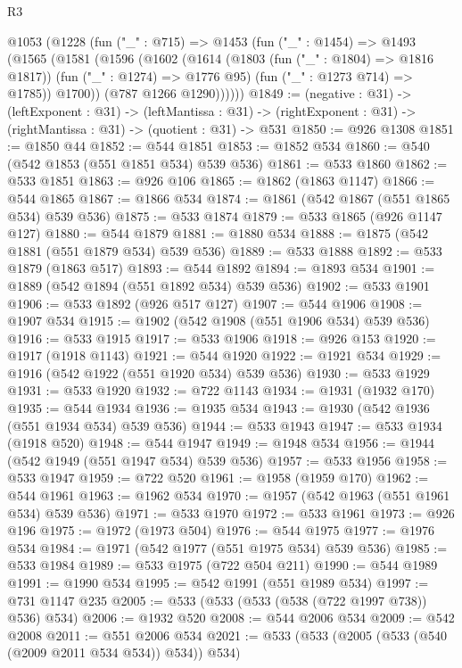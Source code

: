 \begin{lexlean}{R3}
\begin{coremodule}
  @1053
    (@1228
      (fun ("_" : @715) =>
      @1453
        (fun ("_" : @1454) =>
        @1493
          (@1565
            (@1581
              (@1596
                (@1602
                  (@1614
                    (@1803 (fun ("_" : @1804) => @1816 @1817))
                    (fun ("_" : @1274) => @1776 @95)
                    (fun ("_" : @1273 @714) => @1785))
                  @1700))
              (@787 @1266 @1290))))))
@1849 := (negative : @31) ->
  (leftExponent : @31) ->
  (leftMantissa : @31) -> (rightExponent : @31) -> (rightMantissa : @31) -> (quotient : @31) -> @531
@1850 := @926 @1308
@1851 := @1850 @44
@1852 := @544 @1851
@1853 := @1852 @534
@1860 := @540 (@542 @1853 (@551 @1851 @534) @539 @536)
@1861 := @533 @1860
@1862 := @533 @1851
@1863 := @926 @106
@1865 := @1862 (@1863 @1147)
@1866 := @544 @1865
@1867 := @1866 @534
@1874 := @1861 (@542 @1867 (@551 @1865 @534) @539 @536)
@1875 := @533 @1874
@1879 := @533 @1865 (@926 @1147 @127)
@1880 := @544 @1879
@1881 := @1880 @534
@1888 := @1875 (@542 @1881 (@551 @1879 @534) @539 @536)
@1889 := @533 @1888
@1892 := @533 @1879 (@1863 @517)
@1893 := @544 @1892
@1894 := @1893 @534
@1901 := @1889 (@542 @1894 (@551 @1892 @534) @539 @536)
@1902 := @533 @1901
@1906 := @533 @1892 (@926 @517 @127)
@1907 := @544 @1906
@1908 := @1907 @534
@1915 := @1902 (@542 @1908 (@551 @1906 @534) @539 @536)
@1916 := @533 @1915
@1917 := @533 @1906
@1918 := @926 @153
@1920 := @1917 (@1918 @1143)
@1921 := @544 @1920
@1922 := @1921 @534
@1929 := @1916 (@542 @1922 (@551 @1920 @534) @539 @536)
@1930 := @533 @1929
@1931 := @533 @1920
@1932 := @722 @1143
@1934 := @1931 (@1932 @170)
@1935 := @544 @1934
@1936 := @1935 @534
@1943 := @1930 (@542 @1936 (@551 @1934 @534) @539 @536)
@1944 := @533 @1943
@1947 := @533 @1934 (@1918 @520)
@1948 := @544 @1947
@1949 := @1948 @534
@1956 := @1944 (@542 @1949 (@551 @1947 @534) @539 @536)
@1957 := @533 @1956
@1958 := @533 @1947
@1959 := @722 @520
@1961 := @1958 (@1959 @170)
@1962 := @544 @1961
@1963 := @1962 @534
@1970 := @1957 (@542 @1963 (@551 @1961 @534) @539 @536)
@1971 := @533 @1970
@1972 := @533 @1961
@1973 := @926 @196
@1975 := @1972 (@1973 @504)
@1976 := @544 @1975
@1977 := @1976 @534
@1984 := @1971 (@542 @1977 (@551 @1975 @534) @539 @536)
@1985 := @533 @1984
@1989 := @533 @1975 (@722 @504 @211)
@1990 := @544 @1989
@1991 := @1990 @534
@1995 := @542 @1991 (@551 @1989 @534)
@1997 := @731 @1147 @235
@2005 := @533 (@533 (@533 (@538 (@722 @1997 @738)) @536) @534)
@2006 := @1932 @520
@2008 := @544 @2006 @534
@2009 := @542 @2008
@2011 := @551 @2006 @534
@2021 := @533 (@533 (@2005 (@533 (@540 (@2009 @2011 @534 @534)) @534)) @534)

\end{coremodule}
\end{lexlean}
